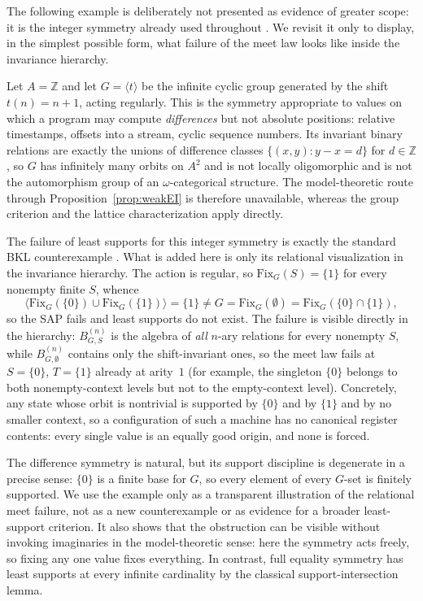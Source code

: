 \documentclass{lmcs}
\newcommand{\Fix}{\mathrm{Fix}}
\begin{document}
The following example is deliberately not presented as evidence of greater scope: it is the integer symmetry already used throughout \cite[Examples~2.3, 4.7 and 4.12]{BKL14}. We revisit it only to display, in the simplest possible form, what failure of the meet law looks like inside the invariance hierarchy.

\begin{exa}\label{exa:offset}
Let $A=\mathbb Z$ and let $G=\langle t\rangle$ be the infinite cyclic
group generated by the shift $t(n)=n+1$, acting regularly. This is the
symmetry appropriate to values on which a program may compute
\emph{differences} but not absolute positions: relative timestamps,
offsets into a stream, cyclic sequence numbers. Its invariant binary
relations are exactly the unions of difference classes
$\{(x,y):y-x=d\}$ for $d \in \mathbb{Z}$, so $G$ has infinitely many orbits on $A^{2}$ and is not locally oligomorphic and is not the automorphism group of an $\omega$-categorical structure. The model-theoretic route through
Proposition~\ref{prop:weakEI} is therefore unavailable, whereas the
group criterion and the lattice characterization apply directly.

The failure of least supports for this integer symmetry is exactly the standard BKL counterexample \cite[Examples~4.7 and 4.12]{BKL14}. What is added here is only its relational visualization in the invariance hierarchy. The action is
regular, so $\Fix_G(S)=\{1\}$ for every nonempty finite $S$, whence
\[
   \bigl\langle\Fix_G(\{0\})\cup\Fix_G(\{1\})\bigr\rangle=\{1\}
   \neq G=\Fix_G(\emptyset)=\Fix_G(\{0\}\cap\{1\}),
\]
so the \textup{SAP} fails and least supports do not exist. The failure
is visible directly in the hierarchy: $B^{(n)}_{G,S}$ is the algebra of
\emph{all} $n$-ary relations for every nonempty $S$, while
$B^{(n)}_{G,\emptyset}$ contains only the shift-invariant ones, so the
meet law fails at $S=\{0\}$, $T=\{1\}$ already at arity~$1$ (for
example, the singleton $\{0\}$ belongs to both nonempty-context levels
but not to the empty-context level). Concretely,
any state whose orbit is nontrivial is supported by $\{0\}$ and by
$\{1\}$ and by no smaller context, so a configuration of such a machine
has no canonical register contents: every single value is an equally
good origin, and none is forced.
\end{exa}

\begin{rem}\label{rem:offsetreading}
The difference symmetry is natural, but its support discipline is degenerate in a precise sense: $\{0\}$ is a finite base for $G$, so every element of every $G$-set is finitely supported. We use the example only as a transparent illustration of the relational meet failure, not as a new counterexample or as evidence for a broader least-support criterion. It also shows that the obstruction can be visible without invoking imaginaries in the model-theoretic sense: here the symmetry acts freely, so fixing any one value fixes everything. In contrast, full equality symmetry has least supports at every infinite cardinality by the classical support-intersection lemma.
\end{rem}
\end{document}
